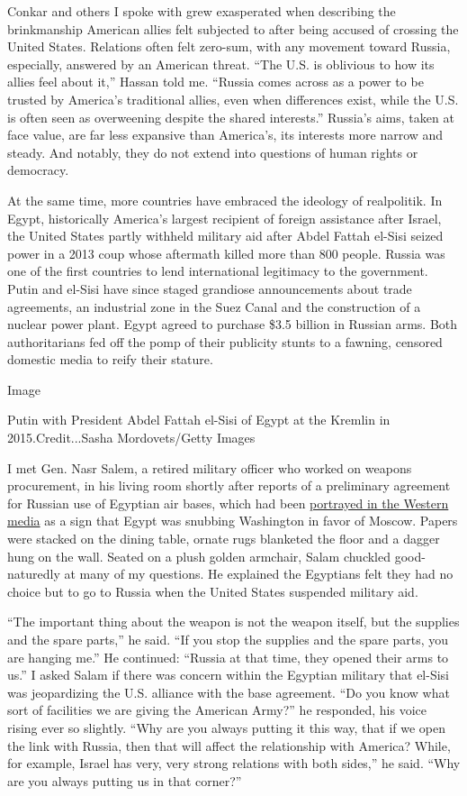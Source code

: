 Conkar and others I spoke with grew exasperated when describing the
brinkmanship American allies felt subjected to after being accused of
crossing the United States. Relations often felt zero-sum, with any
movement toward Russia, especially, answered by an American threat.
``The U.S. is oblivious to how its allies feel about it,'' Hassan told
me. ``Russia comes across as a power to be trusted by America's
traditional allies, even when differences exist, while the U.S. is often
seen as overweening despite the shared interests.'' Russia's aims, taken
at face value, are far less expansive than America's, its interests more
narrow and steady. And notably, they do not extend into questions of
human rights or democracy.

At the same time, more countries have embraced the ideology of
realpolitik. In Egypt, historically America's largest recipient of
foreign assistance after Israel, the United States partly withheld
military aid after Abdel Fattah el-Sisi seized power in a 2013 coup
whose aftermath killed more than 800 people. Russia was one of the first
countries to lend international legitimacy to the government. Putin and
el-Sisi have since staged grandiose announcements about trade
agreements, an industrial zone in the Suez Canal and the construction of
a nuclear power plant. Egypt agreed to purchase \$3.5 billion in Russian
arms. Both authoritarians fed off the pomp of their publicity stunts to
a fawning, censored domestic media to reify their stature.

Image

Putin with President Abdel Fattah el-Sisi of Egypt at the Kremlin in
2015.Credit...Sasha Mordovets/Getty Images

I met Gen. Nasr Salem, a retired military officer who worked on weapons
procurement, in his living room shortly after reports of a preliminary
agreement for Russian use of Egyptian air bases, which had been
\href{https://www.nytimes3xbfgragh.onion/2017/11/30/world/middleeast/russia-egypt-air-bases.html}{portrayed
in the Western media} as a sign that Egypt was snubbing Washington in
favor of Moscow. Papers were stacked on the dining table, ornate rugs
blanketed the floor and a dagger hung on the wall. Seated on a plush
golden armchair, Salam chuckled good-naturedly at many of my questions.
He explained the Egyptians felt they had no choice but to go to Russia
when the United States suspended military aid.

``The important thing about the weapon is not the weapon itself, but the
supplies and the spare parts,'' he said. ``If you stop the supplies and
the spare parts, you are hanging me.'' He continued: ``Russia at that
time, they opened their arms to us.'' I asked Salam if there was concern
within the Egyptian military that el-Sisi was jeopardizing the U.S.
alliance with the base agreement. ``Do you know what sort of facilities
we are giving the American Army?'' he responded, his voice rising ever
so slightly. ``Why are you always putting it this way, that if we open
the link with Russia, then that will affect the relationship with
America? While, for example, Israel has very, very strong relations with
both sides,'' he said. ``Why are you always putting us in that corner?''

